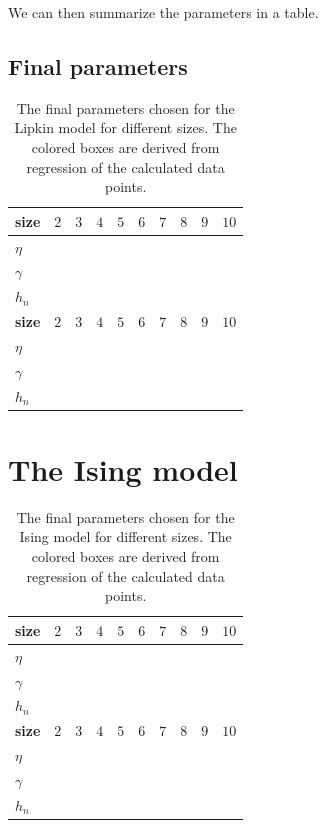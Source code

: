 We can then summarize the parameters in a table.

\subsection{Final parameters}
\begin{table}[H]
  \caption{The final parameters chosen for the Lipkin model for different sizes. The colored boxes are derived from regression of the calculated data points.}\label{tab:lipkin_parameters}
  \begin{center}
    \begin{tabular}{|l|l|l|l|l|l|l|l|l|l|}
      \hline
      \textbf{size} & $2$ &$3$ & $4$& $5$& $6$& $7$&$8$ &$9$ & $10$ \\
      \hline
      $\eta$ & & & & & & & & & \\
      \hline
      $\gamma$ & & & & & & & & &  \\ 
      \hline
      $h_n$ & & & & & & & & & \\
      \hline
      \hline
      \textbf{size} & $2$ &$3$ & $4$& $5$& $6$& $7$&$8$ &$9$ & $10$ \\
      \hline
      $\eta$ & & & & & & & & &   \\
      \hline
      $\gamma$ & & & & & & & & &   \\ 
      \hline
      $h_n$ & & & & & & & & &  \\
      \hline

    \end{tabular}
  \end{center}
\end{table}


\section{The Ising model}
\begin{table}[H]
  \caption{The final parameters chosen for the Ising model for different sizes. The colored boxes are derived from regression of the calculated data points.}\label{tab:Ising_parameters}
  \begin{center}
    \begin{tabular}{|l|l|l|l|l|l|l|l|l|l|}
      \hline
      \textbf{size} & $2$ &$3$ & $4$& $5$& $6$& $7$&$8$ &$9$ & $10$ \\
      \hline
      $\eta$ & & & & & & & & & \\
      \hline
      $\gamma$ & & & & & & & & &  \\ 
      \hline
      $h_n$ & & & & & & & & & \\
      \hline
      \hline
      \textbf{size} & $2$ &$3$ & $4$& $5$& $6$& $7$&$8$ &$9$ & $10$ \\
      \hline
      $\eta$ & & & & & & & & &   \\
      \hline
      $\gamma$ & & & & & & & & &   \\ 
      \hline
      $h_n$ & & & & & & & & &  \\
      \hline

    \end{tabular}
  \end{center}
\end{table}


